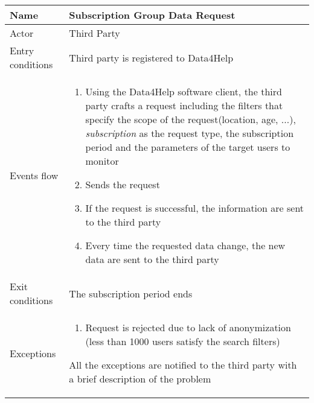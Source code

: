 \begin{table}[h!]
    \begin{tabular}{|l|p{12cm}|}
        \hline
        Name             & Subscription Group Data Request \\ \hline
        Actor            & Third Party \\ \hline
        Entry conditions & Third party is registered to Data4Help \\ \hline
        Events flow      & 
        \begin{enumerate}
            \item Using the Data4Help software client, the third party crafts a request including the filters that specify the scope of the request(location, age, ...), \textit{subscription} as the request type, the subscription period and the parameters of the target users to monitor
            \item Sends the request
            \item If the request is successful, the information are sent to the third party
            \item Every time the requested data change, the new data are sent to the third party
        \end{enumerate} \\ \hline
        Exit conditions  & The subscription period ends \\ \hline
        Exceptions      & 
        \begin{enumerate}
            \item Request is rejected due to lack of anonymization (less than 1000 users satisfy the search filters)
        \end{enumerate} All the exceptions are notified to the third party with a brief description of the problem \\ \hline
    \end{tabular}
\end{table}

